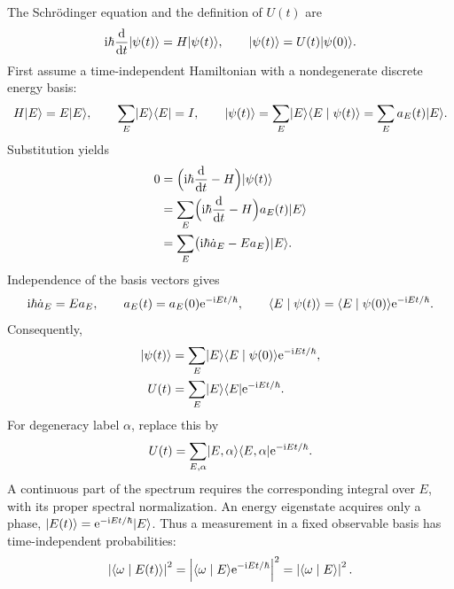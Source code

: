 The Schr\"odinger equation and the definition of $U(t)$ are
\[
 \mathrm{i}\hbar\frac{\mathop{}\!\mathrm{d}}{\mathop{}\!\mathrm{d} t}\lvert \psi(t)\rangle=H\lvert \psi(t)\rangle,\qquad
 \lvert \psi(t)\rangle=U(t)\lvert \psi(0)\rangle.
\]
First assume a time-independent Hamiltonian with a nondegenerate discrete
energy basis:
\[
 H\lvert E\rangle=E\lvert E\rangle,\qquad\sum_E\lvert E\rangle\langle E\rvert=I,\qquad
 \lvert \psi(t)\rangle=\sum_E\lvert E\rangle\langle E\mid \psi(t)\rangle=\sum_Ea_E(t)\lvert E\rangle.
\]
Substitution yields
\begin{align*}
 0&=\Bigl(\mathrm{i}\hbar\frac{\mathop{}\!\mathrm{d}}{\mathop{}\!\mathrm{d} t}-H\Bigr)\lvert \psi(t)\rangle\\
 &=\sum_E\Bigl(\mathrm{i}\hbar\frac{\mathop{}\!\mathrm{d}}{\mathop{}\!\mathrm{d} t}-H\Bigr)a_E(t)\lvert E\rangle\\
 &=\sum_E\bigl(\mathrm{i}\hbar\dot a_E-Ea_E\bigr)\lvert E\rangle.
\end{align*}
Independence of the basis vectors gives
\[
 \mathrm{i}\hbar\dot a_E=Ea_E,\qquad
 a_E(t)=a_E(0)\mathrm{e}^{-\mathrm{i} Et/\hbar},\qquad
 \langle E\mid \psi(t)\rangle=\langle E\mid \psi(0)\rangle\mathrm{e}^{-\mathrm{i} Et/\hbar}.
\]
Consequently,
\begin{align*}
 \lvert \psi(t)\rangle&=\sum_E\lvert E\rangle\langle E\mid \psi(0)\rangle\mathrm{e}^{-\mathrm{i} Et/\hbar},\\
 U(t)&=\sum_E\lvert E\rangle\langle E\rvert\mathrm{e}^{-\mathrm{i} Et/\hbar}.
\end{align*}
For degeneracy label $\alpha$, replace this by
\[
 U(t)=\sum_{E,\alpha}\lvert E,\alpha\rangle\langle E,\alpha\rvert\mathrm{e}^{-\mathrm{i} Et/\hbar}.
\]
A continuous part of the spectrum requires the corresponding integral
over $E$, with its proper spectral normalization.
An energy eigenstate acquires only a phase,
$\lvert E(t)\rangle=\mathrm{e}^{-\mathrm{i} Et/\hbar}\lvert E\rangle$. Thus a measurement in a fixed
observable basis has time-independent probabilities:
\[
 \left\lvert\langle \omega\mid E(t)\rangle\right\rvert^2
 =\left\lvert\langle \omega\mid E\rangle\mathrm{e}^{-\mathrm{i} Et/\hbar}\right\rvert^2
 =\left\lvert\langle \omega\mid E\rangle\right\rvert^2.
\]

